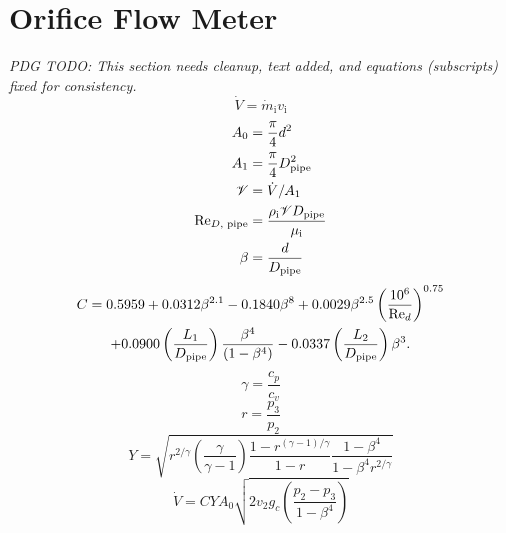 \section{Orifice Flow Meter} \label{sec:Orifice}
\emph{PDG TODO: This section needs cleanup, text added, and equations (subscripts) fixed for consistency.}
\begin{equation}
  \dot{V} = \dot{m}_{\text{i}}v_{\text{i}}
\end{equation}
\begin{align}
  A_0 &= \frac{\pi}{4} d^2 \\
  A_1 &= \frac{\pi}{4} D_{\text{pipe}}^2 \\
  \mathscr{V} &= \dot{V}/A_1 \\
  \text{Re}_{D,\text{ pipe}} &= \frac{\rho_{\text{i}} \mathscr{V} D_{\text{pipe}}}{\mu_{\text{i}}} \\
  \beta &= \frac{d}{D_{\text{pipe}}}
\end{align}
\begin{multline}
  C = 0.5959 + 0.0312\beta^{2.1} - 0.1840\beta^8 + 0.0029\beta^{2.5}\left(\frac{10^6}{\text{Re}_d}\right)^{0.75} \\ 
      + 0.0900\left(\frac{L_1}{D_{\text{pipe}}}\right)\frac{\beta^4}{\left(1-\beta^4\right)} 
      - 0.0337\left(\frac{L_2}{D_{\text{pipe}}}\right)\beta^3.
\end{multline}
\begin{equation}
  \gamma = \frac{c_p}{c_v}
\end{equation}
\begin{equation}
  r = \frac{p_3}{p_2}
\end{equation}
\begin{equation}
  Y = \sqrt{r^{2/\gamma}\left(\frac{\gamma}{\gamma-1}\right)\frac{1-r^{(\gamma-1)/\gamma}}{1-r}\frac{1-\beta^4}{1-\beta^4r^{2/\gamma}}}
\end{equation}
\begin{equation}
  \dot{V} = C Y A_0 \sqrt{2v_2g_c\left(\frac{p_2-p_3}{1-\beta^4}\right)}
\end{equation}
